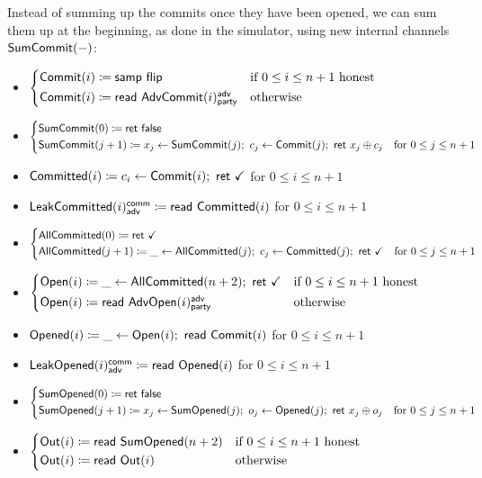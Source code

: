 \noindent Instead of summing up the commits once they have been opened, we can sum them up at the beginning, as done in the simulator, using new internal channels $\mathsf{SumCommit}(-)$:

\begin{itemize}
\item {\color{blue} $\begin{cases*} \Commit(i) \coloneqq \samp{\flip} & \text{if $0 \leq i \leq n+1$ honest} \\ \Commit(i) \coloneqq \read{\AdvCommit(i)^\adv_\party} & \text{otherwise} \end{cases*}$}
\item {\color{blue} $\begin{cases*} \SumCommit(0) \coloneqq \ret{\false} & \\ \SumCommit(j+1) \coloneqq x_j \leftarrow \SumCommit(j); \ c_j \leftarrow \Commit(j); \ \ret{x_j \oplus c_j} & \text{for $0 \leq j \leq n+1$} \end{cases*}$}
\item {\color{magenta} $\mathsf{Committed}(i) \coloneqq c_i \leftarrow \mathsf{Commit}(i); \ \mathsf{ret} \ \checkmark$ for $0 \leq i \leq n+1$}
\item {\color{magenta} $\mathsf{LeakCommitted}(i)^{\mathsf{comm}}_{\mathsf{adv}} \coloneqq \mathsf{read} \ \mathsf{Committed}(i)$ for $0 \leq i \leq n+1$}
\item {\color{magenta} $\begin{cases*} \AllCommitted(0) \coloneqq \ret{\checkmark} & \\ \AllCommitted(j+1) \coloneqq \_ \leftarrow \AllCommitted(j); \ c_j \leftarrow \Committed(j); \ \ret{\checkmark} & \text{for $0 \leq j \leq n+1$} \end{cases*}$}
\item {\color{teal} $\begin{cases*} \Open(i) \coloneqq \_ \leftarrow \AllCommitted(n+2); \ \ret{\checkmark} & \text{if $0 \leq i \leq n+1$ honest} \\ \Open(i) \coloneqq \read{\AdvOpen(i)^\adv_\party} & \text{otherwise} \end{cases*}$}
\item {\color{red} $\mathsf{Opened}(i) \coloneqq \_ \leftarrow \mathsf{Open}(i); \ \mathsf{read} \ \mathsf{Commit}(i)$ for $0 \leq i \leq n+1$}
\item {\color{red} $\mathsf{LeakOpened}(i)^{\mathsf{comm}}_{\mathsf{adv}} \coloneqq \mathsf{read} \ \mathsf{Opened}(i)$ for $0 \leq i \leq n+1$}
\item {\color{red} $\begin{cases*} \SumOpened(0) \coloneqq \ret{\false} & \\ \SumOpened(j+1) \coloneqq x_j \leftarrow \SumOpened(j); \ o_j \leftarrow \Opened(j); \ \ret{x_j \oplus o_j} & \text{for $0 \leq j \leq n+1$} \end{cases*}$}
\item $\begin{cases*} \Out(i) \coloneqq \read{\SumOpened(n+2)} & \text{if $0 \leq i \leq n+1$ honest} \\ \Out(i) \coloneqq \read{\Out(i)} & \text{otherwise} \end{cases*}$
\end{itemize}

